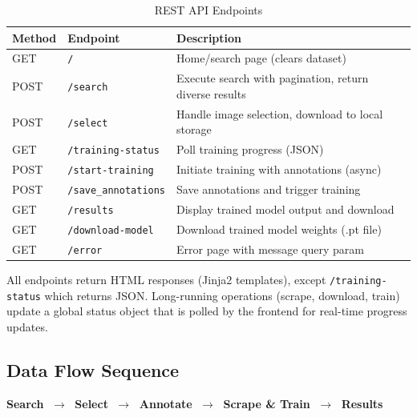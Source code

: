 \documentclass[12pt, letterpaper]{article}
\newcommand{\code}[1]{\texttt{\small\colorbox{codebg}{#1}}}
\begin{document}
\begin{table}[H]
  \centering
  \caption{REST API Endpoints}
  \begin{tabularx}{\linewidth}{@{} l l X @{}}
    \toprule
    \textbf{Method} & \textbf{Endpoint}         & \textbf{Description} \\
    \midrule
    GET    & \code{/}                  & Home/search page (clears dataset) \\
    POST   & \code{/search}            & Execute search with pagination, return diverse results \\
    POST   & \code{/select}            & Handle image selection, download to local storage \\
    GET    & \code{/training-status}   & Poll training progress (JSON) \\
    POST   & \code{/start-training}    & Initiate training with annotations (async) \\
    POST   & \code{/save\_annotations}  & Save annotations and trigger training \\
    GET    & \code{/results}           & Display trained model output and download \\
    GET    & \code{/download-model}    & Download trained model weights (.pt file) \\
    GET    & \code{/error}             & Error page with message query param \\
    \bottomrule
  \end{tabularx}
\end{table}

All endpoints return HTML responses (Jinja2 templates), except \code{/training-status}
which returns JSON. Long-running operations (scrape, download, train) update a global
status object that is polled by the frontend for real-time progress updates.

\subsection{Data Flow Sequence}

\begin{infobox}[title=SearchVision Workflow Overview]
  \textbf{Search} $\;\rightarrow\;$ \textbf{Select} $\;\rightarrow\;$
  \textbf{Annotate} $\;\rightarrow\;$ \textbf{Scrape \& Train} $\;\rightarrow\;$
  \textbf{Results}
\end{infobox}
\end{document}
